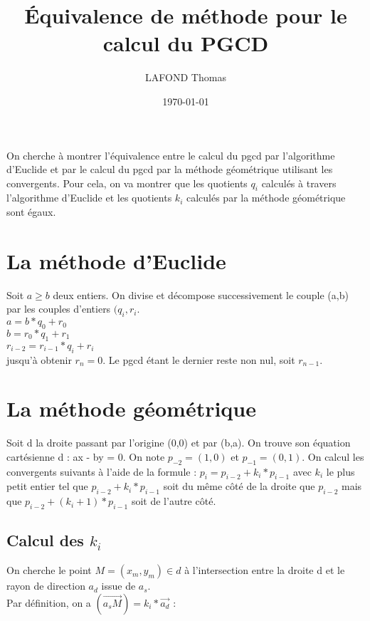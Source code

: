 \documentclass{article}
\title{Équivalence de méthode pour le calcul du PGCD} %
\author{LAFOND Thomas} %
\date{\today} %
\begin{document}
\maketitle %

On cherche à montrer l'équivalence entre le calcul du pgcd par l'algorithme d'Euclide et par le calcul du pgcd par la méthode géométrique utilisant les convergents. Pour cela, on va montrer que les quotients $q_i$ calculés à travers l'algorithme d'Euclide et les quotients $k_i$ calculés par la méthode géométrique sont égaux.

\section{La méthode d'Euclide}

Soit $a \geq b$ deux entiers. On divise et décompose successivement le couple (a,b) par les couples d'entiers $(q_{i}, r_{i}$.\\
$a = b * q_{0} + r_{0}$\\
$b = r_{0} * q_{1} + r_{1}$\\
$r_{i-2} = r_{i-1} * q_{i} + r_{i}$\\

jusqu'à obtenir $r_{n} = 0$. Le pgcd étant le dernier reste non nul, soit $r_{n-1}$.

\section{La méthode géométrique}

Soit d la droite passant par l'origine (0,0) et par (b,a). On trouve son équation cartésienne d : ax - by = 0. On note $p_{-2} = (1,0)$ et $p_{-1}=(0,1)$. On calcul les convergents suivants à l'aide de la formule : $p_{i} = p_{i-2} + k_{i} * p_{i-1}$ avec $k_{i}$ le plus petit entier tel que $p_{i-2} + k_{i} * p_{i-1}$ soit du même côté de la droite que $p_{i-2}$ mais que $p_{i-2} + (k_{i}+1) * p_{i-1}$ soit de l'autre côté.\newline

\subsection{Calcul des $k_{i}$}

On cherche le point $M = (x_m, y_m) \in d$ à l'intersection entre la droite d et le rayon de direction $a_{d}$ issue de $a_{s}$. \\
Par définition, on a $(\overrightarrow{a_{s} M}) = k_i*\overrightarrow{a_{d}}$ :
\end{document}
